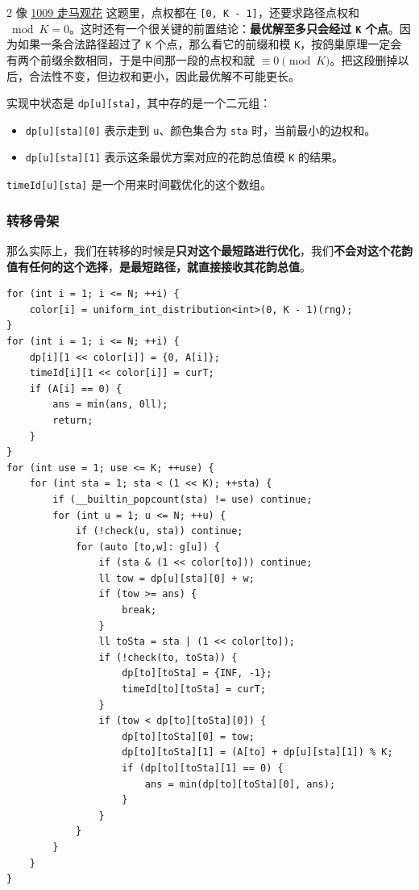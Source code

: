 \begin{multicols*}{2}
		像 \href{https://acm.hdu.edu.cn/contest/problem?cid=1201&pid=1009}{1009 走马观花} 这题里，点权都在 \texttt{[0, K - 1]}，还要求路径点权和 $\bmod K = 0$。这时还有一个很关键的前置结论：\textbf{最优解至多只会经过 \texttt{K} 个点}。因为如果一条合法路径超过了 \texttt{K} 个点，那么看它的前缀和模 \texttt{K}，按鸽巢原理一定会有两个前缀余数相同，于是中间那一段的点权和就 $\equiv 0 \pmod K$。把这段删掉以后，合法性不变，但边权和更小，因此最优解不可能更长。

		实现中状态是 \texttt{dp[u][sta]}，其中存的是一个二元组：

		\begin{itemize}
			\item \texttt{dp[u][sta][0]} 表示走到 \texttt{u}、颜色集合为 \texttt{sta} 时，当前最小的边权和。
			\item \texttt{dp[u][sta][1]} 表示这条最优方案对应的花韵总值模 \texttt{K} 的结果。
		\end{itemize}

		\texttt{timeId[u][sta]} 是一个用来时间戳优化的这个数组。

		\subsubsection{转移骨架}

		那么实际上，我们在转移的时候是\textbf{只对这个最短路进行优化}，我们\textbf{不会对这个花韵值有任何的这个选择}，\textbf{是最短路径，就直接接收其花韵总值}。

		\begin{verbatim}
for (int i = 1; i <= N; ++i) {
	color[i] = uniform_int_distribution<int>(0, K - 1)(rng);
}
for (int i = 1; i <= N; ++i) {
	dp[i][1 << color[i]] = {0, A[i]};
	timeId[i][1 << color[i]] = curT;
	if (A[i] == 0) {
		ans = min(ans, 0ll);
		return;
	}
}
for (int use = 1; use <= K; ++use) {
	for (int sta = 1; sta < (1 << K); ++sta) {
		if (__builtin_popcount(sta) != use) continue;
		for (int u = 1; u <= N; ++u) {
			if (!check(u, sta)) continue;
			for (auto [to,w]: g[u]) {
				if (sta & (1 << color[to])) continue;
				ll tow = dp[u][sta][0] + w;
				if (tow >= ans) {
					break;
				}
				ll toSta = sta | (1 << color[to]);
				if (!check(to, toSta)) {
					dp[to][toSta] = {INF, -1};
					timeId[to][toSta] = curT;
				}
				if (tow < dp[to][toSta][0]) {
					dp[to][toSta][0] = tow;
					dp[to][toSta][1] = (A[to] + dp[u][sta][1]) % K;
					if (dp[to][toSta][1] == 0) {
						ans = min(dp[to][toSta][0], ans);
					}
				}
			}
		}
	}
}
		\end{verbatim}


\end{multicols*}
